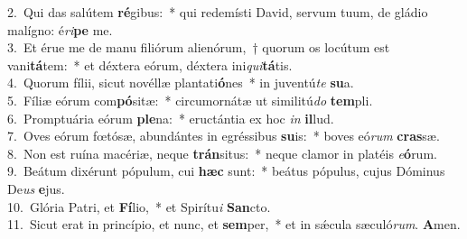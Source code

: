 {2.~}Qui das salútem \textbf{ré}gibus:~* qui redemísti David, servum tuum, de gládio malígno: é\textit{ri}\textbf{pe} me.\\
{3.~}Et érue me de manu filiórum alienórum,~† quorum os locútum est vani\textbf{tá}tem:~* et déxtera eórum, déxtera ini\textit{qui}\textbf{tá}tis.\\
{4.~}Quorum fílii, sicut novéllæ plantati\textbf{ó}nes~* in juventú\textit{te} \textbf{su}a.\\
{5.~}Fíliæ eórum com\textbf{pó}sitæ:~* circumornátæ ut similitú\textit{do} \textbf{tem}pli.\\
{6.~}Promptuária eórum \textbf{ple}na:~* eructántia ex hoc \textit{in} \textbf{il}lud.\\
{7.~}Oves eórum fœtósæ, abundántes in egréssibus \textbf{su}is:~* boves eó\textit{rum} \textbf{cras}sæ.\\
{8.~}Non est ruína macériæ, neque \textbf{trán}situs:~* neque clamor in platéis \textit{e}\textbf{ó}rum.\\
{9.~}Beátum dixérunt pópulum, cui \textbf{hæc} sunt:~* beátus pópulus, cujus Dóminus De\textit{us} \textbf{e}jus.\\
{10.~}Glória Patri, et \textbf{Fí}lio,~* et Spirítu\textit{i} \textbf{San}cto.\\
{11.~}Sicut erat in princípio, et nunc, et \textbf{sem}per,~* et in sǽcula sæculó\textit{rum}. \textbf{A}men.\\

